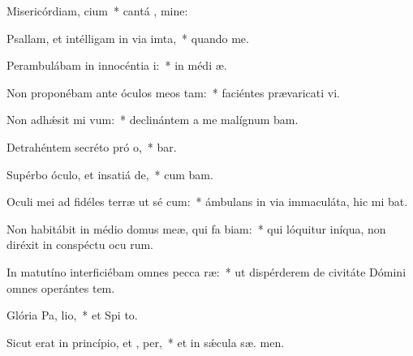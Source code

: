 \item Misericórdiam,  cium~* cantá , mine:
\item Psallam, et intélligam in via imta,~* quando   me.
\item Perambulábam in innocéntia  i:~* in médi  æ.
\item Non proponébam ante óculos meos  tam:~* faciéntes prævaricati vi.
\item Non adhǽsit mi  vum:~* declinántem a me malígnum  bam.
\item Detrahéntem secréto pró o,~*  bar.
\item Supérbo óculo, et insatiá de,~* cum   bam.
\item Oculi mei ad fidéles terræ ut sé cum:~* ámbulans in via immaculáta, hic mi bat.
\item Non habitábit in médio domus meæ, qui fa biam:~* qui lóquitur iníqua, non diréxit in conspéctu ocu rum.
\item In matutíno interficiébam omnes pecca ræ:~* ut dispérderem de civitáte Dómini omnes operántes tem.
\item Glória Pa,  lio,~* et Spi to.
\item Sicut erat in princípio, et ,  per,~* et in sǽcula sæ. men.
